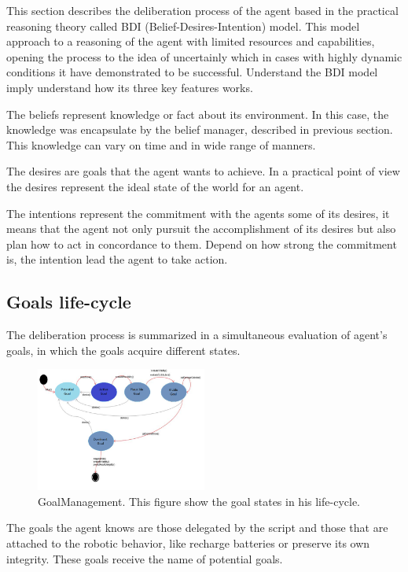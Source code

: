 This section describes the deliberation process of the agent based in the practical reasoning theory called BDI (Belief-Desires-Intention) model. This model approach to a reasoning of the agent with limited resources and capabilities, opening the process to the idea of uncertainly which in cases with highly dynamic conditions it have demonstrated to be successful. Understand the BDI model imply understand how its three key features works.

The beliefs represent knowledge or fact about its environment. In this case, the knowledge was encapsulate by the belief manager, described in previous section. This knowledge can vary on time and in wide range of manners.

The desires are goals that the agent wants to achieve. In a practical point of view the desires represent the ideal state of the world for an agent.

The intentions represent the commitment with the agents some of its desires, it means that the agent not only pursuit the accomplishment of its desires but also plan how to act in concordance to them. Depend on how strong the commitment is, the intention lead the agent to take action.

\subsection{Goals life-cycle}

The deliberation process is summarized in a simultaneous evaluation of agent's goals, in which the goals acquire different states.

\begin{figure}
	\centering
	\includegraphics[width=0.5\textwidth]{Images/GoalManagement.png} 
	\caption{GoalManagement. This figure show the goal states in his life-cycle.}
	\label{fig:GoalManager}
\end{figure}

The goals the agent knows are those  delegated by the script and those that are attached to the robotic behavior, like recharge batteries or preserve its own integrity. These goals receive the name of potential goals. 

